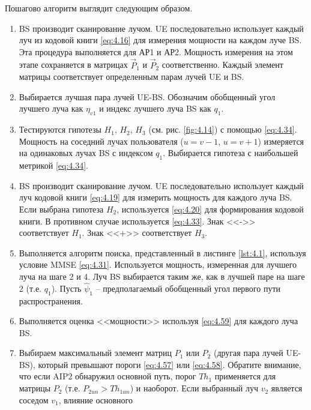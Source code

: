 Пошагово алгоритм выглядит следующим образом.
\begin{enumerate}[label=\textbf{Шаг \arabic*:}]
    \item BS производит сканирование лучом. UE последовательно использует
          каждый луч из кодовой книги \eqref{eq:4.16}
          для измерения мощности на каждом луче BS.  Эта процедура
          выполняется для АР1 и АР2. Мощность измерения на этом этапе
          сохраняется в матрицах $\vec P_1$ и $\vec P_2$ соответственно.
          Каждый элемент матрицы соответствует
          определенным парам лучей UE и BS.
    \item Выбирается лучшая пара лучей UE-BS. Обозначим обобщенный угол
          лучшего луча как $\eta_{v1}$ и индекс лучшего луча BS как
          $q_1$.
    \item Тестируются гипотезы $H_1$, $H_2$, $H_3$ (см. рис. \ref{fig:4.14}) с
          помощью \eqref{eq:4.34}. Мощность на соседний лучах пользователя
          ($u=v-1$, $u=v+1$) измеряется на одинаковых лучах BS с индексом
          $q_1$. Выбирается гипотеза с наибольшей метрикой \eqref{eq:4.34}.
    \item BS производит сканирование лучом.
          UE последовательно использует каждый луч кодовой книги \eqref{eq:4.19} для
          измерить мощность для каждого луча BS. Если выбрана гипотеза $H_2$,
          используется \eqref{eq:4.20} для формирования кодовой книги.
          В противном случае используется \eqref{eq:4.33}.
          Знак <<->> соответствует $H_1$. Знак <<+>> соответствует $H_3$.
    \item Выполняется алгоритм поиска, представленный в листинге \ref{lst:4.1}, используя
          условие MMSE \eqref{eq:4.31}.
          Используется мощность, измеренная для лучшего луча на
          шаге 2 и 4. Луч BS выбирается таким же, как в
          лучшей паре на шаге 2 (т.е. $q_1$). Пусть $\hat \psi_1$ --
          предполагаемый обобщенный угол первого пути распространения.
    \item Выполняется оценка <<мощности>> используя \eqref{eq:4.59} для
          каждого луча BS.
    \item Выбираем максимальный элемент матриц $P_1$ или $P_2$ (другая пара лучей
          UE-BS), который превышают пороги \eqref{eq:4.57} или \eqref{eq:4.58}.
          Обратите внимание, что если AIP2 обнаружил основной путь, порог
          $Th_1$ применяется для матрицы $P_2$ (т.е. $P_{2un} > Th_{1un}$) и наоборот.
          Если выбранный луч $v_2$ является соседом $v_1$, влияние основного

\end{enumerate}
